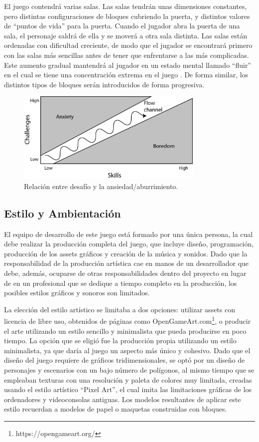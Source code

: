 El juego contendrá varias salas. Las salas tendrán unas dimensiones constantes, pero distintas configuraciones de bloques cubriendo la puerta, y distintos valores de ``puntos de vida'' para la puerta. Cuando el jugador abra la puerta de una sala, el personaje saldrá de ella y se moverá a otra sala distinta.  Las salas están ordenadas con dificultad creciente, de modo que el jugador se encontrará primero con las salas más sencillas antes de tener que enfrentarse a las más complicadas. Este aumento gradual mantendrá al jugador en un estado mental llamado ``fluir'' en el cual se tiene una concentración extrema en el juego \cite{flow}. De forma similar, los distintos tipos de bloques serán introducidos de forma progresiva.

\begin{figure}[h]
	\includegraphics[width=0.8\textwidth]{images/intro/design/flow}
	\centering
	\caption{Relación entre desafío y la ansiedad/aburrimiento.}
\end{figure}

\subsection{Estilo y Ambientación}
El equipo de desarrollo de este juego está formado por una única persona, la cual debe realizar la producción completa del juego, que incluye diseño, programación, producción de los assets gráficos y creación de la música y sonidos. Dado que la responsabilidad de la producción artística cae en manos de un desarrollador que debe, además, ocuparse de otras responsabilidades dentro del proyecto en lugar de en un profesional que se dedique a tiempo completo en la producción, los posibles estilos gráficos y sonoros son limitados.

La elección del estilo artístico se limitaba a dos opciones: utilizar assets con licencia de libre uso, obtenidos de páginas como OpenGameArt.com\footnote{https://opengameart.org/}, o producir el arte utilizando un estilo sencillo y minimalista que pueda producirse en poco tiempo. La opción que se eligió fue la producción propia utilizando un estilo minimalista, ya que daría al juego un aspecto más único y cohesivo.
Dado que el diseño del juego requiere de gráficos tridimensionales, se optó por un diseño de personajes y escenarios con un bajo número de polígonos, al mismo tiempo que se empleaban texturas con una resolución y paleta de colores muy limitada, creadas usando el estilo artístico ``Pixel Art'', el cual imita las limitaciones gráficas de los ordenadores y videoconsolas antiguas. Los modelos resultantes de aplicar este estilo recuerdan a modelos de papel o maquetas construidas con bloques.

